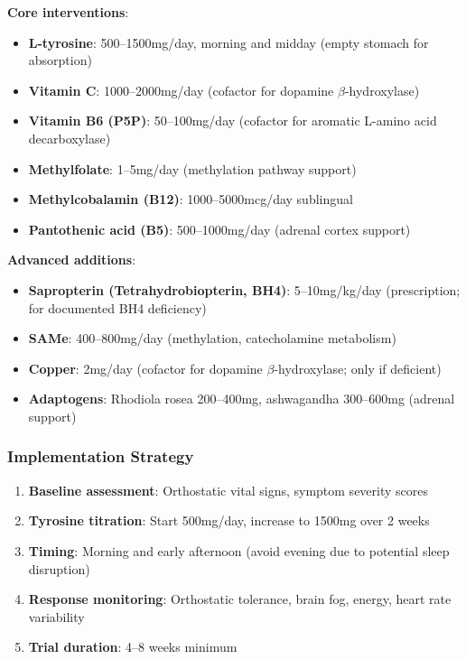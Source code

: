 \textbf{Core interventions}:
\begin{itemize}
    \item \textbf{L-tyrosine}: 500--1500mg/day, morning and midday (empty stomach for absorption)
    \item \textbf{Vitamin C}: 1000--2000mg/day (cofactor for dopamine $\beta$-hydroxylase)
    \item \textbf{Vitamin B6 (P5P)}: 50--100mg/day (cofactor for aromatic L-amino acid decarboxylase)
    \item \textbf{Methylfolate}: 1--5mg/day (methylation pathway support)
    \item \textbf{Methylcobalamin (B12)}: 1000--5000mcg/day sublingual
    \item \textbf{Pantothenic acid (B5)}: 500--1000mg/day (adrenal cortex support)
\end{itemize}

\textbf{Advanced additions}:
\begin{itemize}
    \item \textbf{Sapropterin (Tetrahydrobiopterin, BH4)}: 5--10mg/kg/day (prescription; for documented BH4 deficiency)
    \item \textbf{SAMe}: 400--800mg/day (methylation, catecholamine metabolism)
    \item \textbf{Copper}: 2mg/day (cofactor for dopamine $\beta$-hydroxylase; only if deficient)
    \item \textbf{Adaptogens}: Rhodiola rosea 200--400mg, ashwagandha 300--600mg (adrenal support)
\end{itemize}

\subsubsection{Implementation Strategy}

\begin{enumerate}
    \item \textbf{Baseline assessment}: Orthostatic vital signs, symptom severity scores
    \item \textbf{Tyrosine titration}: Start 500mg/day, increase to 1500mg over 2 weeks
    \item \textbf{Timing}: Morning and early afternoon (avoid evening due to potential sleep disruption)
    \item \textbf{Response monitoring}: Orthostatic tolerance, brain fog, energy, heart rate variability
    \item \textbf{Trial duration}: 4--8 weeks minimum
\end{enumerate}

